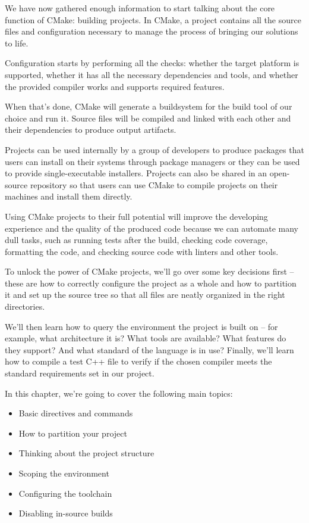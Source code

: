 We have now gathered enough information to start talking about the core function of CMake: building projects. In CMake, a project contains all the source files and configuration necessary to manage the process of bringing our solutions to life.

Configuration starts by performing all the checks: whether the target platform is supported, whether it has all the necessary dependencies and tools, and whether the provided compiler works and supports required features.

When that's done, CMake will generate a buildsystem for the build tool of our choice and run it. Source files will be compiled and linked with each other and their dependencies to produce output artifacts.

Projects can be used internally by a group of developers to produce packages that users can install on their systems through package managers or they can be used to provide single-executable installers. Projects can also be shared in an open-source repository so that users can use CMake to compile projects on their machines and install them directly.

Using CMake projects to their full potential will improve the developing experience and the quality of the produced code because we can automate many dull tasks, such as running tests after the build, checking code coverage, formatting the code, and checking source code with linters and other tools.

To unlock the power of CMake projects, we'll go over some key decisions first – these are how to correctly configure the project as a whole and how to partition it and set up the source tree so that all files are neatly organized in the right directories.

We'll then learn how to query the environment the project is built on – for example, what architecture it is? What tools are available? What features do they support? And what standard of the language is in use? Finally, we'll learn how to compile a test C++ file to verify if the chosen compiler meets the standard requirements set in our project.

In this chapter, we're going to cover the following main topics:

\begin{itemize}
\item 
Basic directives and commands

\item 
How to partition your project

\item 
Thinking about the project structure

\item 
Scoping the environment

\item 
Configuring the toolchain

\item 
Disabling in-source builds
\end{itemize}

